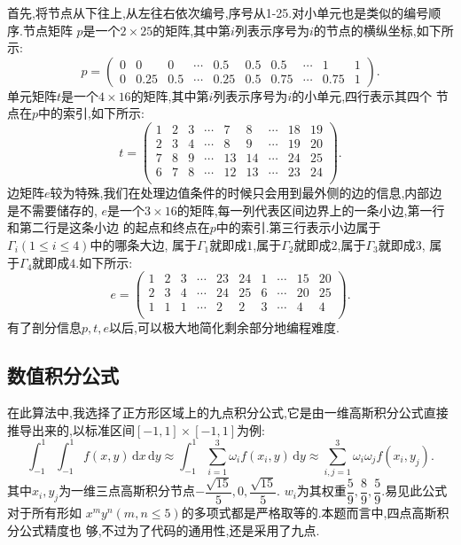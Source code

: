 \documentclass[11pt,reqno]{article}
\numberwithin{equation}{section}
\renewcommand{\d}{\,\mathrm d}
\begin{document}
首先,将节点从下往上,从左往右依次编号,序号从1-25.对小单元也是类似的编号顺序.节点矩阵
$p$是一个$2\times25$的矩阵,其中第$i$列表示序号为$i$的节点的横纵坐标,如下所示:
\begin{equation}
	p=\begin{pmatrix}
		0& 0 & 0 & \cdots & 0.5 &0.5&0.5&\cdots& 1 & 1\\
		0& 0.25 & 0.5 & \cdots& 0.25 &0.5&0.75&\cdots& 0.75 &1
	  \end{pmatrix}.
\end{equation}
单元矩阵$t$是一个$4\times16$的矩阵,其中第$i$列表示序号为$i$的小单元,四行表示其四个
节点在$p$中的索引,如下所示:
\begin{equation}
	t=\begin{pmatrix}
		1 & 2 & 3 &\cdots& 7 & 8 &\cdots & 18 & 19\\
		2 & 3 & 4 &\cdots& 8 & 9 &\cdots & 19 & 20\\
		7 & 8 & 9 &\cdots& 13 & 14 &\cdots & 24 & 25\\
		6 & 7 & 8 &\cdots& 12 & 13 &\cdots & 23 & 24\\
		\end{pmatrix}.
\end{equation}
边矩阵$e$较为特殊,我们在处理边值条件的时候只会用到最外侧的边的信息,内部边是不需要储存的,
$e$是一个$3\times16$的矩阵,每一列代表区间边界上的一条小边,第一行和第二行是这条小边
的起点和终点在$p$中的索引.第三行表示小边属于$\Gamma_i(1\le i\le 4)$中的哪条大边,
属于$\Gamma_1$就即成$1$,属于$\Gamma_2$就即成$2$,属于$\Gamma_3$就即成$3$,
属于$\Gamma_4$就即成$4$.如下所示:
\begin{equation}
	e=\begin{pmatrix}
		1 & 2 & 3 &\cdots& 23 & 24 &1&\cdots & 15 & 20\\
		2 & 3 & 4 &\cdots& 24 & 25 &6&\cdots & 20 & 25\\
		1 & 1 & 1 &\cdots& 2 & 2 &3 &\cdots & 4 & 4\\
		\end{pmatrix}.
\end{equation}
有了剖分信息$p,t,e$以后,可以极大地简化剩余部分地编程难度.

\subsection{数值积分公式}

在此算法中,我选择了正方形区域上的九点积分公式,它是由一维高斯积分公式直接
推导出来的,以标准区间$[-1,1]\times[-1,1]$为例:
\begin{equation}
	\int_{-1}^1\int_{-1}^1f(x,y)\d x\d y
	\approx\int_{-1}^1\sum_{i=1}^{3}\omega_if(x_i,y)\d y
	\approx\sum_{i,j=1}^3\omega_i\omega_jf(x_i,y_j).
\end{equation}	
其中$x_i,y_j$为一维三点高斯积分节点$-\dfrac{\sqrt{15}}{5},0,\dfrac{\sqrt{15}}{5}.$
$w_i$为其权重$\dfrac{5}{9},\dfrac{8}{9},\dfrac{5}{9}.$易见此公式对于所有形如
$x^my^n(m,n\le 5)$的多项式都是严格取等的.本题而言中,四点高斯积分公式精度也
够,不过为了代码的通用性,还是采用了九点.
\end{document}
